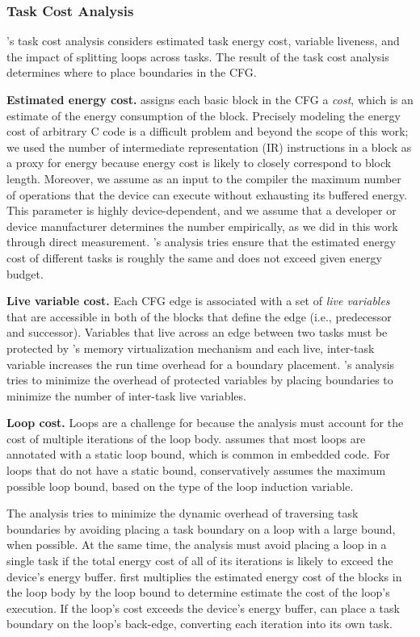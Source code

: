 \subsubsection{Task Cost Analysis}
\sys's task cost analysis considers estimated task energy cost, variable
liveness, and the impact of splitting loops across tasks.  The result of the
task cost analysis determines where to place boundaries in the CFG.
 
{\noindent \bf Estimated energy cost.} \sys assigns each basic block in the
CFG a {\em cost}, which is an estimate of the energy consumption of the block.
Precisely modeling the energy cost of arbitrary C code is a difficult problem
and beyond the scope of this work; we used the number of intermediate
representation (IR) instructions in a block as a proxy for energy because
energy cost is likely to closely correspond to block length.  Moreover, we
assume as an input to the compiler the maximum number of operations that the
device can execute without exhausting its buffered energy. This parameter is
highly device-dependent, and we assume that a developer or device manufacturer
determines the number empirically, as we did in this work through direct
measurement.  \sys's analysis tries ensure that the estimated energy cost of different tasks
is roughly the same and does not exceed given energy budget. 

{\noindent \bf Live variable cost.}
Each CFG edge is associated with a set of {\em live variables} that are
accessible in both of the blocks that define the edge (i.e., predecessor and
successor).  Variables that live across an edge between two tasks must be
protected by \sys's memory virtualization mechanism and each live, inter-task
variable increases the run time overhead for a boundary placement.  \sys's
analysis tries to minimize the overhead of protected variables by placing
boundaries to minimize the number of inter-task live variables.


{\noindent \bf Loop cost.}
Loops are a challenge for \sys because the analysis must account for the cost
of multiple iterations of the loop body.  \sys assumes that most loops are
annotated with a static loop bound, which is common in embedded code.  For
loops that do not have a static bound, \sys conservatively assumes the maximum
possible loop bound, based on the type of the loop induction variable.

The analysis tries to minimize the dynamic overhead of traversing task
boundaries by avoiding placing a task boundary on a loop with a large bound,
when possible. At the same time, the analysis must avoid placing a loop in a
single task if the total energy cost of all of its iterations is likely to
exceed the device's energy buffer.  \sys first multiplies the estimated energy
cost of the blocks in the loop body by the loop bound to determine estimate the
cost of the loop's execution.  If the loop's cost exceeds the device's energy
buffer, \sys can place a task boundary on the loop's back-edge, converting each
iteration into its own task.  

